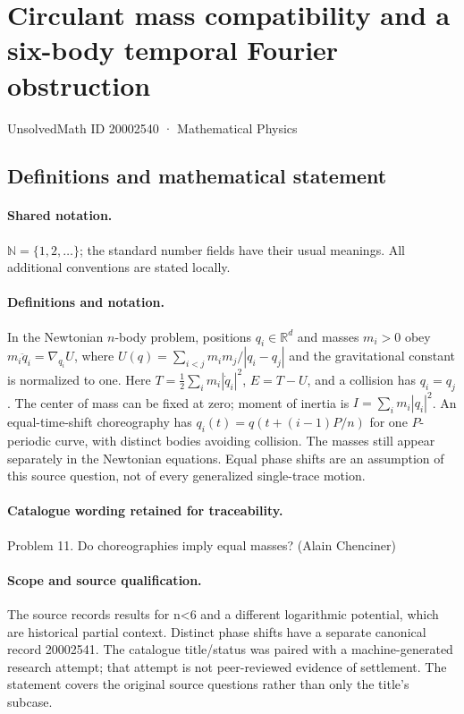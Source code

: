 \documentclass[11pt]{article}
\begin{document}
\setcounter{section}{20002539}
\section{Circulant mass compatibility and a six-body temporal Fourier obstruction}\label{20002540}
{\small UnsolvedMath ID 20002540 · Mathematical Physics}
\subsection{Definitions and mathematical statement}

\paragraph{Shared notation.}$\mathbb N=\{1,2,\ldots\}$; the standard number fields have their usual meanings. All additional conventions are stated locally.


\paragraph{Definitions and notation.}In the Newtonian $n$-body problem, positions $q_i\in\mathbb R^d$ and masses $m_i>0$ obey $m_i\ddot q_i=\nabla_{q_i}U$, where $U(q)=\sum_{i<j}m_im_j/|q_i-q_j|$ and the gravitational constant is normalized to one. Here $T=\tfrac12\sum_i m_i|\dot q_i|^2$, $E=T-U$, and a collision has $q_i=q_j$. The center of mass can be fixed at zero; moment of inertia is $I=\sum_i m_i|q_i|^2$. An equal-time-shift choreography has $q_i(t)=q(t+(i-1)P/n)$ for one $P$-periodic curve, with distinct bodies avoiding collision. The masses still appear separately in the Newtonian equations. Equal phase shifts are an assumption of this source question, not of every generalized single-trace motion.

\paragraph{Catalogue wording retained for traceability.}
Problem 11. Do choreographies imply equal masses? (Alain Chenciner)
\paragraph{Scope and source qualification.}The source records results for n<6 and a different logarithmic potential, which are historical partial context. Distinct phase shifts have a separate canonical record 20002541. The catalogue title/status was paired with a machine-generated research attempt; that attempt is not peer-reviewed evidence of settlement. The statement covers the original source questions rather than only the title’s subcase.
\end{document}
